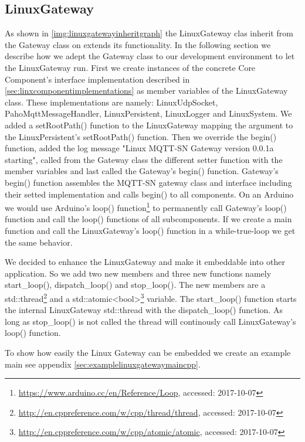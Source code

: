 \subsection{LinuxGateway}
As shown in \autoref{img:linuxgatewayinheritgraph} the LinuxGateway clas inherit from the Gateway class on extends its functionality. In the following section we describe how we adept the Gateway class to our development environment to let the LinuxGateway run.
First we create instances of the concrete Core Component's interface implementation described in \autoref{sec:linxcomponentimplementations} as member variables of the LinuxGateway class.
These implementations are namely: LinuxUdpSocket, PahoMqttMessageHandler, LinuxPersistent, LinuxLogger and LinuxSystem.
We added a setRootPath() function to the LinuxGateway mapping the argument to the LinuxPersistent's setRootPath() function.
Then we override the begin() function, added the log message "Linux MQTT-SN Gateway version 0.0.1a starting", called from the Gateway class the different setter function with the member variables and last called the Gateway's begin() function.
Gateway's begin() function assembles the MQTT-SN gateway class and interface including their setted implementation and calls begin() to all components.
On an Arduino we would use Arduino's loop() function\footnote{\url{https://www.arduino.cc/en/Reference/Loop}, accessed: 2017-10-07} to permanently call Gateway's loop() function and call the loop() functions of all subcomponents.
If we create a main function and call the LinuxGateway's loop() function in a while-true-loop we get the same behavior.

We decided to enhance the LinuxGateway and make it embeddable into other application.
So we add two new members and three new functions namely start\_loop(), dispatch\_loop() and stop\_loop().
The new members are a std::thread\footnote{\url{http://en.cppreference.com/w/cpp/thread/thread}, accessed: 2017-10-07} and a std::atomic<bool>\footnote{\url{http://en.cppreference.com/w/cpp/atomic/atomic}, accessed: 2017-10-07} variable.
The start\_loop() function starts the internal LinuxGateway std::thread with the dispatch\_loop() function. As long as stop\_loop() is not called the thread will continously call LinuxGateway's loop() function.

To show how easily the Linux Gateway can be embedded we create an example main see appendix \autoref{sec:examplelinuxgatewaymaincpp}.


